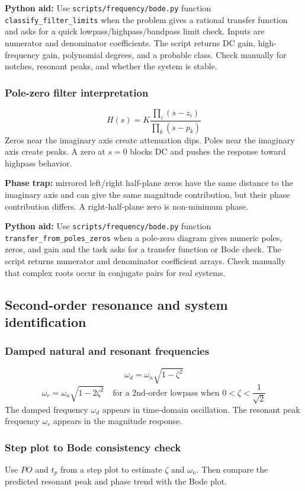 \textbf{Python aid:} Use \texttt{scripts/frequency/bode.py} function \texttt{classify\_filter\_limits} when the problem gives a rational transfer function and asks for a quick lowpass/highpass/bandpass limit check. Inputs are numerator and denominator coefficients. The script returns DC gain, high-frequency gain, polynomial degrees, and a probable class. Check manually for notches, resonant peaks, and whether the system is stable.

\subsubsection{Pole-zero filter interpretation}
\[
H(s)=K\frac{\prod_i(s-z_i)}{\prod_k(s-p_k)}
\]
Zeros near the imaginary axis create attenuation dips. Poles near the imaginary axis create peaks. A zero at \(s=0\) blocks DC and pushes the response toward highpass behavior.

\textbf{Phase trap:} mirrored left/right half-plane zeros have the same distance to the imaginary axis and can give the same magnitude contribution, but their phase contribution differs. A right-half-plane zero is non-minimum phase.

\textbf{Python aid:} Use \texttt{scripts/frequency/bode.py} function \texttt{transfer\_from\_poles\_zeros} when a pole-zero diagram gives numeric poles, zeros, and gain and the task asks for a transfer function or Bode check. The script returns numerator and denominator coefficient arrays. Check manually that complex roots occur in conjugate pairs for real systems.

\subsection{Second-order resonance and system identification}

\subsubsection{Damped natural and resonant frequencies}
\[
\omega_d=\omega_n\sqrt{1-\zeta^2}
\]
\[
\omega_r=\omega_n\sqrt{1-2\zeta^2}\quad\text{for a 2nd-order lowpass when }0<\zeta<\frac{1}{\sqrt{2}}
\]
The damped frequency \(\omega_d\) appears in time-domain oscillation. The resonant peak frequency \(\omega_r\) appears in the magnitude response.

\subsubsection{Step plot to Bode consistency check}
Use \(PO\) and \(t_p\) from a step plot to estimate \(\zeta\) and \(\omega_n\). Then compare the predicted resonant peak and phase trend with the Bode plot.

